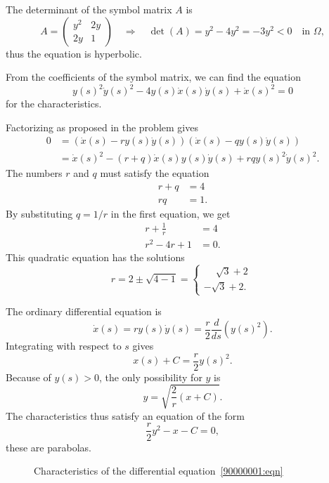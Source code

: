 \begin{loesung}
\begin{teilaufgaben}
\item
The determinant of the symbol matrix $A$ is
\[
A=\begin{pmatrix}
y^2&2y\\
2y&1
\end{pmatrix}
\quad\Rightarrow\quad
\det (A)=y^2-4y^2=-3y^2<0 \quad\text{in $\Omega$},
\]
thus the equation is hyperbolic.
\item
From the coefficients of the symbol matrix, we can find the equation
\[
y(s)^2\dot y(s)^2-4y(s)\dot x(s)\dot y(s)+\dot x(s)^2=0
\]
for the characteristics.
\item
Factorizing as proposed in the problem gives
\begin{align*}
0&=(\dot x(s)-ry(s)\dot y(s))(\dot x(s)-qy(s)\dot y(s))
\\
&=\dot x(s)^2-(r+q)\dot x(s) y(s)\dot y(s)+rqy(s)^2\dot y(s)^2.
\end{align*}
The numbers $r$ and $q$ must satisfy the equation
\begin{align*}
r+q&=4\\
rq&=1.
\end{align*}
By substituting
$q=1/r$ in the first equation, we get
\begin{align*}
r+\frac1r&=4\\
r^2-4r+1&=0.
\end{align*}
This quadratic equation has the solutions
\begin{equation}
r
=
2\pm\sqrt{4-1}
=
\begin{cases}
\phantom{-}\sqrt{3}+2\phantom{.}\\
         - \sqrt{3}+2.
\end{cases}
\label{90000001:r}
\end{equation}
\item
The ordinary differential equation is
\[
\dot x(s)=ry(s)\dot y(s)=\frac{r}{2}\frac{d}{ds}(y(s)^2).
\]
Integrating with respect to $s$ gives
\[
x(s) + C=\frac{r}{2}y(s)^2.
\]
Because of $y(s)>0$, the only possibility for $y$ is
\[
y = \sqrt{\frac{2}{r}(x+C)}.
\]
The characteristics thus satisfy an equation of the form
\begin{equation}
\frac{r}2y^2-x-C=0,
\label{90000001:parabola}
\end{equation}
these are parabolas.
\end{teilaufgaben}
\begin{figure}
\centering
{}
\caption{Characteristics of the differential equation~\eqref{90000001:eqn}
}
\end{figure}
\end{loesung}
